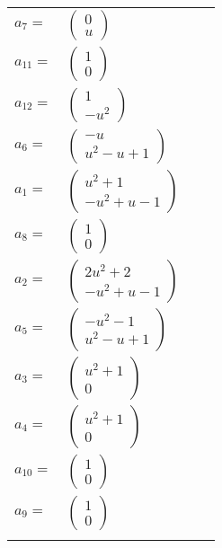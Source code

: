\documentclass[1p]{elsarticle_modified}
\theoremstyle{definition}
\begin{document}
\begin{tabular}{m{7pt} m{180pt} m{7pt} m{180pt} }
\flushright $a_{7}=$&$\begin{pmatrix}0\\u\end{pmatrix}$ \\
\flushright $a_{11}=$&$\begin{pmatrix}1\\0\end{pmatrix}$ \\
\flushright $a_{12}=$&$\begin{pmatrix}1\\- u^2\end{pmatrix}$ \\
\flushright $a_{6}=$&$\begin{pmatrix}- u\\u^2- u+1\end{pmatrix}$ \\
\flushright $a_{1}=$&$\begin{pmatrix}u^2+1\\- u^2+u-1\end{pmatrix}$ \\
\flushright $a_{8}=$&$\begin{pmatrix}1\\0\end{pmatrix}$ \\
\flushright $a_{2}=$&$\begin{pmatrix}2 u^2+2\\- u^2+u-1\end{pmatrix}$ \\
\flushright $a_{5}=$&$\begin{pmatrix}- u^2-1\\u^2- u+1\end{pmatrix}$ \\
\flushright $a_{3}=$&$\begin{pmatrix}u^2+1\\0\end{pmatrix}$ \\
\flushright $a_{4}=$&$\begin{pmatrix}u^2+1\\0\end{pmatrix}$ \\
\flushright $a_{10}=$&$\begin{pmatrix}1\\0\end{pmatrix}$ \\
\flushright $a_{9}=$&$\begin{pmatrix}1\\0\end{pmatrix}$\\&\end{tabular}
\end{document}
